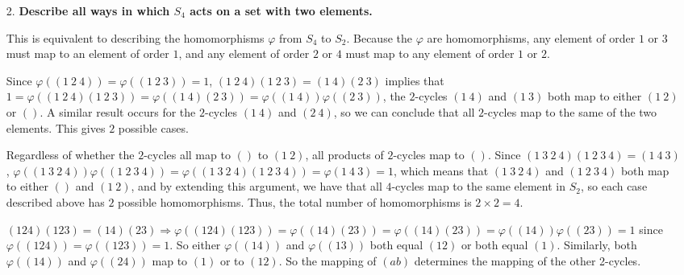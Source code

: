 \documentclass[a4paper,12pt]{article}
\begin{document}
\begin{enumerate}
    \item[2.]
        \boldmath
        \textbf{Describe all ways in which $S_4$ acts on a set with two elements.} \par
        \unboldmath
        This is equivalent to describing the homomorphisms $\varphi$ from $S_4$ to $S_2$. Because the $\varphi$ are homomorphisms, any element of order $1$ or $3$ must map to an element of order $1$, and any element of order $2$ or $4$ must map to any element of order $1$ or $2$. \par
        Since $\varphi((1\ 2\ 4)) = \varphi((1\ 2\ 3)) = 1$, $(1\ 2\ 4)(1\ 2\ 3) = (1\ 4)(2\ 3)$ implies that $1 = \varphi((1\ 2\ 4)(1\ 2\ 3)) = \varphi((1\ 4)(2\ 3)) = \varphi((1\ 4)) \varphi((2\ 3))$, the $2$-cycles $(1\ 4)$ and $(1\ 3)$ both map to either $(1\ 2)$ or $()$. A similar result occurs for the $2$-cycles $(1\ 4)$ and $(2\ 4)$, so we can conclude that all $2$-cycles map to the same of the two elements. This gives $2$ possible cases. \par
        Regardless of whether the $2$-cycles all map to $()$ to $(1\ 2)$, all products of $2$-cycles map to $()$. Since $(1\ 3\ 2\ 4)(1\ 2\ 3\ 4) = (1\ 4\ 3)$, $\varphi((1\ 3\ 2\ 4)) \varphi((1\ 2\ 3\ 4)) = \varphi((1\ 3\ 2\ 4)(1\ 2\ 3\ 4)) = \varphi(1\ 4\ 3) = 1$, which means that $(1\ 3\ 2\ 4)$ and $(1\ 2\ 3\ 4)$ both map to either $()$ and $(1\ 2)$, and by extending this argument, we have that all $4$-cycles map to the same element in $S_2$, so each case described above has $2$ possible homomorphisms. Thus, the total number of homomorphisms is $2 \times 2 = 4$.
        \iffalse
            First, it can be seen that the mapping of any 2-cycle determines the mappings of all the 2-cycles in $S_4$. \par
            If the 2-cycles all map to the identity permutation in $S_2$, then it can be directly shown that the 4-cycles in $S_4$ must all map to the same element in $S_2$, of which there are 2 choices. Otherwise, if the 2-cycles all map to the permutation $(1\ 2)$, then any product of two 2-cycles maps to $(1\ 2)(1\ 2) = ()$, the identity permutation, and the 4-cycles must all again map to the same element in $S_2$. Thus, the total number of possibilities for homomorphisms is $2 + 2 = 4$.
        \fi
        \iffalse
            $(124)(123) = (14)(23) \Rightarrow \varphi((124)(123)) = \varphi((14)(23)) = \varphi((14)(23)) = \varphi((14))\varphi((23)) = 1$ since $\varphi((124)) = \varphi((123)) = 1$. So either $\varphi((14))$ and $\varphi((13))$ both equal $(12)$ or both equal $(1)$. Similarly, both $\varphi((14))$ and $\varphi((24))$ map to $(1)$ or to $(12)$. So the mapping of $(ab)$ determines the mapping of the other 2-cycles. \par

\end{enumerate}
\end{document}
